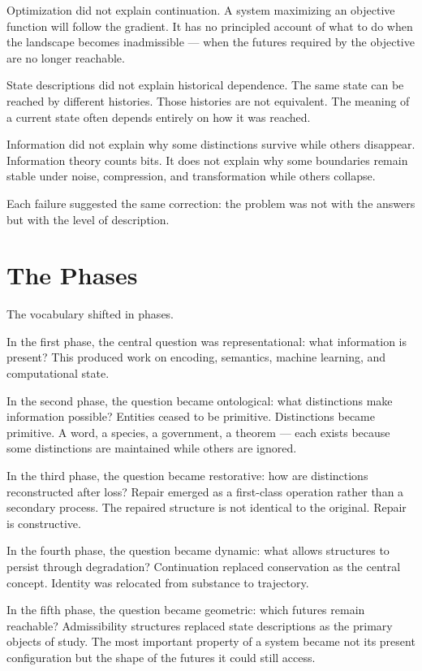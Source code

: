 \documentclass[12pt, openany]{book}
\begin{document}
Optimization did not explain continuation. A system maximizing an objective
function will follow the gradient. It has no principled account of what to
do when the landscape becomes inadmissible — when the futures required by
the objective are no longer reachable.

State descriptions did not explain historical dependence. The same state can
be reached by different histories. Those histories are not equivalent. The
meaning of a current state often depends entirely on how it was reached.

Information did not explain why some distinctions survive while others
disappear. Information theory counts bits. It does not explain why some
boundaries remain stable under noise, compression, and transformation while
others collapse.

Each failure suggested the same correction: the problem was not with the
answers but with the level of description.

\section{The Phases}

The vocabulary shifted in phases.

In the first phase, the central question was representational: what
information is present? This produced work on encoding, semantics, machine
learning, and computational state.

In the second phase, the question became ontological: what distinctions make
information possible? Entities ceased to be primitive. Distinctions became
primitive. A word, a species, a government, a theorem — each exists because
some distinctions are maintained while others are ignored.

In the third phase, the question became restorative: how are distinctions
reconstructed after loss? Repair emerged as a first-class operation rather
than a secondary process. The repaired structure is not identical to the
original. Repair is constructive.

In the fourth phase, the question became dynamic: what allows structures to
persist through degradation? Continuation replaced conservation as the
central concept. Identity was relocated from substance to trajectory.

In the fifth phase, the question became geometric: which futures remain
reachable? Admissibility structures replaced state descriptions as the
primary objects of study. The most important property of a system became not
its present configuration but the shape of the futures it could still access.
\end{document}
